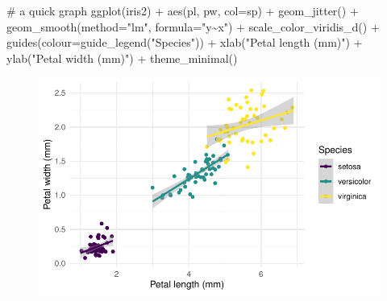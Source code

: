 \documentclass[
  letterpaper,
  DIV=11,
  numbers=noendperiod]{scrreprt}
\newenvironment{Shaded}{\begin{snugshade}}{\end{snugshade}}
\newcommand{\AttributeTok}[1]{\textcolor[rgb]{0.40,0.45,0.13}{#1}}
\newcommand{\CommentTok}[1]{\textcolor[rgb]{0.37,0.37,0.37}{#1}}
\newcommand{\ControlFlowTok}[1]{\textcolor[rgb]{0.00,0.23,0.31}{#1}}
\newcommand{\FunctionTok}[1]{\textcolor[rgb]{0.28,0.35,0.67}{#1}}
\newcommand{\NormalTok}[1]{\textcolor[rgb]{0.00,0.23,0.31}{#1}}
\newcommand{\OtherTok}[1]{\textcolor[rgb]{0.00,0.23,0.31}{#1}}
\newcommand{\SpecialCharTok}[1]{\textcolor[rgb]{0.37,0.37,0.37}{#1}}
\newcommand{\StringTok}[1]{\textcolor[rgb]{0.13,0.47,0.30}{#1}}
\begin{document}
\begin{Shaded}
\begin{Highlighting}[]
\CommentTok{\# a quick graph}
\FunctionTok{ggplot}\NormalTok{(iris2) }\SpecialCharTok{+} 
  \FunctionTok{aes}\NormalTok{(pl, pw, }\AttributeTok{col=}\NormalTok{sp) }\SpecialCharTok{+} 
  \FunctionTok{geom\_jitter}\NormalTok{() }\SpecialCharTok{+} 
  \FunctionTok{geom\_smooth}\NormalTok{(}\AttributeTok{method=}\StringTok{"lm"}\NormalTok{, }\AttributeTok{formula=}\StringTok{"y\textasciitilde{}x"}\NormalTok{) }\SpecialCharTok{+} 
  \FunctionTok{scale\_color\_viridis\_d}\NormalTok{() }\SpecialCharTok{+}
  \FunctionTok{guides}\NormalTok{(}\AttributeTok{colour=}\FunctionTok{guide\_legend}\NormalTok{(}\StringTok{"Species"}\NormalTok{)) }\SpecialCharTok{+}
  \FunctionTok{xlab}\NormalTok{(}\StringTok{"Petal length (mm)"}\NormalTok{) }\SpecialCharTok{+} \FunctionTok{ylab}\NormalTok{(}\StringTok{"Petal width (mm)"}\NormalTok{) }\SpecialCharTok{+}
  \FunctionTok{theme\_minimal}\NormalTok{()}
\end{Highlighting}
\end{Shaded}

\begin{figure}[H]

{\centering \includegraphics{3min-tour_files/figure-pdf/unnamed-chunk-1-1.pdf}

}

\end{figure}

\begin{Shaded}
\end{Shaded}
\end{document}
